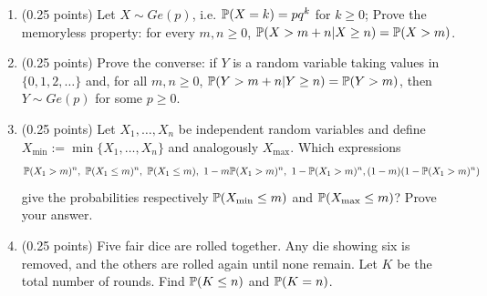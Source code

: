\documentclass[a4paper]{report}
\begin{document}
\begin{problem}
   \begin{enumerate}
        \item (0.25 points) Let $X\sim Ge(p)$, i.e.
        $\P(X=k)=pq^k$ for
       $k \geq 0$;
        Prove the
        memoryless property:
        for every $m,n\geq0$, $\P(X>m+n|X\geq n)=\P(X>m)$.

        \item (0.25 points) Prove the converse:
        if $Y$ is a random variable
        taking values in
       $\{0,1,2, \dots\}$
        and, for all $m,n\geq0$, $\P(Y>m+n|Y\geq n)=\P(Y>m)$,
        then $Y\sim Ge(p)$
        for some $p\geq0$.

        \item (0.25 points)
        Let $X_1,\dots,
        X_n$ be independent
        random variables and
        define
        $X_{\min}:=\min\{X_1,\dots,X_n\}$ and
        analogously
       $X_{\max}$.
        Which expressions
       \[
       \P(X_1 > m)^n,
       \,\,
       \P(X_1 \leq m)^n,
       \,\,
              \P(X_1 \leq m),
       \,\,
              1-
       m  \P(X_1 > m)^n,
       \,\,
              1 -
           \P(X_1 > m)^n,
       (1-m)(1- \P(X_1 > m)^n)
       \]
        give the probabilities
        respectively
       $\P(X_{\min} \leq m)$
        and
       $\P(X_{\max} \leq m)$?
        Prove your answer.
        \item (0.25 points)
        Five
        fair
        dice are rolled together. Any die
        showing six
        is removed, and
        the others are rolled again until
        none remain.
        Let $K$ be the total number of
        rounds. Find
       $\P(K\leq n)$
        and $\P(K=n)$.


   \end{enumerate}


\end{problem}
\end{document}
